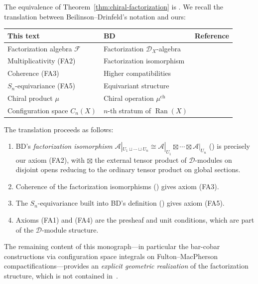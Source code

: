 \begin{remark}
\label{rem:bd-factorization-dictionary}
The equivalence of Theorem~\ref{thm:chiral-factorization} is
\cite[Theorem~3.4.9]{BD04}.  We recall the translation between
Beilinson--Drinfeld's notation and ours:
\begin{center}
\renewcommand{\arraystretch}{1.25}
\begin{tabular}{lll}
\textbf{This text} & \textbf{BD~\cite{BD04}} & \textbf{Reference} \\
\hline
Factorization algebra $\mathcal{F}$ & Factorization $\mathcal{D}_X$-algebra &
  \cite[\S3.4.1]{BD04} \\
Multiplicativity (FA2) & Factorization isomorphism &
  \cite[(3.4.4.2)]{BD04} \\
Coherence (FA3) & Higher compatibilities &
  \cite[Proposition~3.4.2]{BD04} \\
$S_n$-equivariance (FA5) & Equivariant structure &
  \cite[\S3.4]{BD04} \\
Chiral product $\mu$ & Chiral operation $\mu^{\operatorname{ch}}$ &
  \cite[\S3.3.1]{BD04} \\
Configuration space $C_n(X)$ & $n$-th stratum of $\operatorname{Ran}(X)$ &
  \cite[\S3.4.10--3.4.12]{BD04} \\
\end{tabular}
\end{center}

The translation proceeds as follows:
\begin{enumerate}
\item BD's \emph{factorization isomorphism}
$\mathcal{A}|_{U_1 \sqcup \cdots \sqcup U_n} \cong
\mathcal{A}|_{U_1} \boxtimes \cdots \boxtimes \mathcal{A}|_{U_n}$
(\cite[(3.4.4.2)]{BD04}) is precisely our axiom (FA2), with
$\boxtimes$ the external tensor product of $\mathcal{D}$-modules
on disjoint opens reducing to the ordinary tensor product on
global sections.
\item Coherence of the factorization isomorphisms
(\cite[Proposition~3.4.2]{BD04}) gives axiom (FA3).
\item The $S_n$-equivariance built into BD's definition
(\cite[\S3.4]{BD04}) gives axiom (FA5).
\item Axioms (FA1) and (FA4) are the presheaf and unit conditions,
which are part of the $\mathcal{D}$-module structure.
\end{enumerate}

The remaining content of this monograph---in particular the
bar-cobar constructions via configuration space integrals on
Fulton--MacPherson compactifications---provides an
\emph{explicit geometric realization} of the factorization
structure, which is not contained in~\cite{BD04}.
\end{remark}

